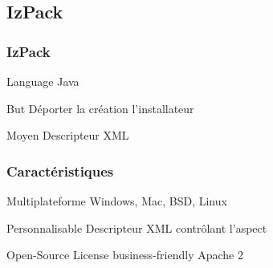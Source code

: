 \subsection{IzPack}
\begin{frame}\frametitle{IzPack}
\begin{beamerboxesrounded}{Language}
	Java
\end{beamerboxesrounded}
\begin{beamerboxesrounded}{But}
	Déporter la création l'installateur
\end{beamerboxesrounded}
\begin{beamerboxesrounded}{Moyen}
Descripteur XML
\end{beamerboxesrounded}
\end{frame}
\begin{frame}\frametitle{Caractéristiques}
	\begin{beamerboxesrounded}{Multiplateforme}
	Windows, Mac, BSD, Linux
	\end{beamerboxesrounded}
	\begin{beamerboxesrounded}{Personnalisable}
	Descripteur XML contrôlant l'aspect
	\end{beamerboxesrounded}
	\begin{beamerboxesrounded}{Open-Source}
	License business-friendly Apache 2
	\end{beamerboxesrounded}
\end{frame}

